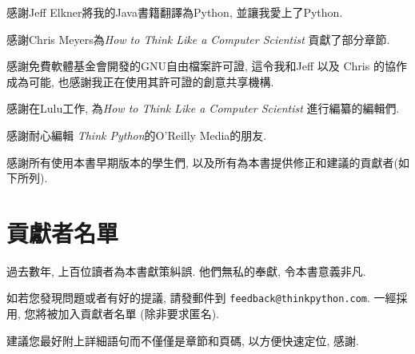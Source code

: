 \documentclass[10pt]{book}
\begin{document}
感謝Jeff Elkner將我的Java書籍翻譯為Python, 
並讓我愛上了Python.

感謝Chris Meyers為{\em How to Think Like a Computer Scientist}
貢獻了部分章節. 


感謝免費軟體基金會開發的GNU自由檔案許可證, 
這令我和Jeff 以及 Chris 的協作成為可能,
也感謝我正在使用其許可證的創意共享機構. 


感謝在Lulu工作, 為{\em How to Think Like a Computer Scientist}
進行編纂的編輯們. 

感謝耐心編輯 {\em Think Python}的O'Reilly Media的朋友. 

感謝所有使用本書早期版本的學生們, 以及所有為本書提供修正和建議的貢獻者(如下所列). 


\section*{貢獻者名單}

過去數年, 上百位讀者為本書獻策糾誤. 
他們無私的奉獻, 令本書意義非凡. 

如若您發現問題或者有好的提議, 請發郵件到 
{\tt feedback@thinkpython.com}. 一經採用, 您將被加入貢獻者名單
(除非要求匿名).

建議您最好附上詳細語句而不僅僅是章節和頁碼, 以方便快速定位, 感謝. 
\end{document}
